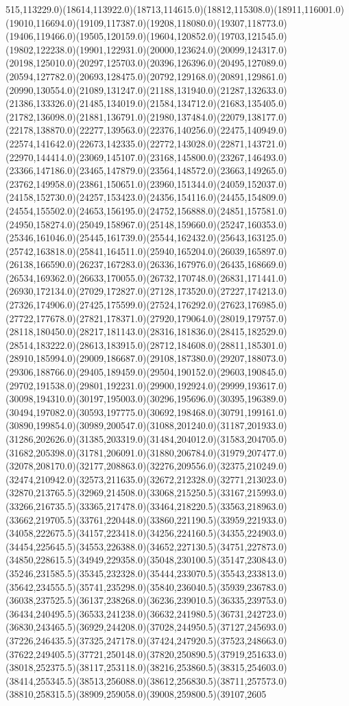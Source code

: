 \documentclass[conference]{IEEEtran}
\begin{document}
515,113229.0)(18614,113922.0)(18713,114615.0)(18812,115308.0)(18911,116001.0)(19010,116694.0)(19109,117387.0)(19208,118080.0)(19307,118773.0)(19406,119466.0)(19505,120159.0)(19604,120852.0)(19703,121545.0)(19802,122238.0)(19901,122931.0)(20000,123624.0)(20099,124317.0)(20198,125010.0)(20297,125703.0)(20396,126396.0)(20495,127089.0)(20594,127782.0)(20693,128475.0)(20792,129168.0)(20891,129861.0)(20990,130554.0)(21089,131247.0)(21188,131940.0)(21287,132633.0)(21386,133326.0)(21485,134019.0)(21584,134712.0)(21683,135405.0)(21782,136098.0)(21881,136791.0)(21980,137484.0)(22079,138177.0)(22178,138870.0)(22277,139563.0)(22376,140256.0)(22475,140949.0)(22574,141642.0)(22673,142335.0)(22772,143028.0)(22871,143721.0)(22970,144414.0)(23069,145107.0)(23168,145800.0)(23267,146493.0)(23366,147186.0)(23465,147879.0)(23564,148572.0)(23663,149265.0)(23762,149958.0)(23861,150651.0)(23960,151344.0)(24059,152037.0)(24158,152730.0)(24257,153423.0)(24356,154116.0)(24455,154809.0)(24554,155502.0)(24653,156195.0)(24752,156888.0)(24851,157581.0)(24950,158274.0)(25049,158967.0)(25148,159660.0)(25247,160353.0)(25346,161046.0)(25445,161739.0)(25544,162432.0)(25643,163125.0)(25742,163818.0)(25841,164511.0)(25940,165204.0)(26039,165897.0)(26138,166590.0)(26237,167283.0)(26336,167976.0)(26435,168669.0)(26534,169362.0)(26633,170055.0)(26732,170748.0)(26831,171441.0)(26930,172134.0)(27029,172827.0)(27128,173520.0)(27227,174213.0)(27326,174906.0)(27425,175599.0)(27524,176292.0)(27623,176985.0)(27722,177678.0)(27821,178371.0)(27920,179064.0)(28019,179757.0)(28118,180450.0)(28217,181143.0)(28316,181836.0)(28415,182529.0)(28514,183222.0)(28613,183915.0)(28712,184608.0)(28811,185301.0)(28910,185994.0)(29009,186687.0)(29108,187380.0)(29207,188073.0)(29306,188766.0)(29405,189459.0)(29504,190152.0)(29603,190845.0)(29702,191538.0)(29801,192231.0)(29900,192924.0)(29999,193617.0)(30098,194310.0)(30197,195003.0)(30296,195696.0)(30395,196389.0)(30494,197082.0)(30593,197775.0)(30692,198468.0)(30791,199161.0)(30890,199854.0)(30989,200547.0)(31088,201240.0)(31187,201933.0)(31286,202626.0)(31385,203319.0)(31484,204012.0)(31583,204705.0)(31682,205398.0)(31781,206091.0)(31880,206784.0)(31979,207477.0)(32078,208170.0)(32177,208863.0)(32276,209556.0)(32375,210249.0)(32474,210942.0)(32573,211635.0)(32672,212328.0)(32771,213023.0)(32870,213765.5)(32969,214508.0)(33068,215250.5)(33167,215993.0)(33266,216735.5)(33365,217478.0)(33464,218220.5)(33563,218963.0)(33662,219705.5)(33761,220448.0)(33860,221190.5)(33959,221933.0)(34058,222675.5)(34157,223418.0)(34256,224160.5)(34355,224903.0)(34454,225645.5)(34553,226388.0)(34652,227130.5)(34751,227873.0)(34850,228615.5)(34949,229358.0)(35048,230100.5)(35147,230843.0)(35246,231585.5)(35345,232328.0)(35444,233070.5)(35543,233813.0)(35642,234555.5)(35741,235298.0)(35840,236040.5)(35939,236783.0)(36038,237525.5)(36137,238268.0)(36236,239010.5)(36335,239753.0)(36434,240495.5)(36533,241238.0)(36632,241980.5)(36731,242723.0)(36830,243465.5)(36929,244208.0)(37028,244950.5)(37127,245693.0)(37226,246435.5)(37325,247178.0)(37424,247920.5)(37523,248663.0)(37622,249405.5)(37721,250148.0)(37820,250890.5)(37919,251633.0)(38018,252375.5)(38117,253118.0)(38216,253860.5)(38315,254603.0)(38414,255345.5)(38513,256088.0)(38612,256830.5)(38711,257573.0)(38810,258315.5)(38909,259058.0)(39008,259800.5)(39107,2605
\end{document}
